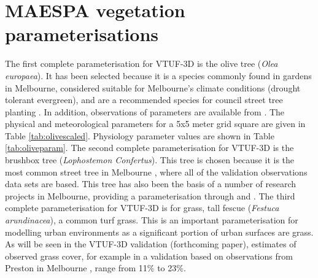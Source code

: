 \documentclass[final,3p,times,authoryear]{elsarticle}
\begin{document}
\begin{thebibliography}{00}


\bibitem[ ()]{}

\end{thebibliography}


\appendix
\setcounter{table}{0}
\renewcommand{\thetable}{A\arabic{table}}



\section{MAESPA vegetation parameterisations}\label{sec:maespavegpara}  
%

The first complete parameterisation for VTUF-3D is the olive tree (\textit{Olea europaea}). It has been selected because it is a species commonly found in gardens in Melbourne, considered suitable for Melbourne's climate conditions (drought tolerant evergreen), and are a recommended species for council street tree planting \citep{PortPhillip2010}. In addition, observations of parameters are available from \cite{Coutts2014a}. The physical and meteorological parameters for a 5x5 meter grid square are given in Table \ref{tab:olivescaled}. Physiology parameter values are shown in Table \ref{tab:oliveparam}. The second complete parameterisation for VTUF-3D is the  brushbox tree (\textit{Lophostemon Confertus}). This tree is chosen because it is the most common street tree in Melbourne \citep{Frank2006}, where all of the validation observations data sets are based. This tree has also been the basis of a number of research projects in Melbourne, providing a parameterisation through \cite{Coutts2016} and \cite{Coutts2015ICUC}. The third complete parameterisation for VTUF-3D is for grass, tall fescue (\textit{Festuca arundinacea}), a common turf grass. This is an important parameterisation for modelling urban environments as a significant portion of urban surfaces are grass. As will be seen in the VTUF-3D validation (forthcoming paper), estimates of observed grass cover, for example in a validation based on observations from Preston in Melbourne \citep{Coutts2007,Nury2015}, range from 11\% to 23\%. 
\end{document}
